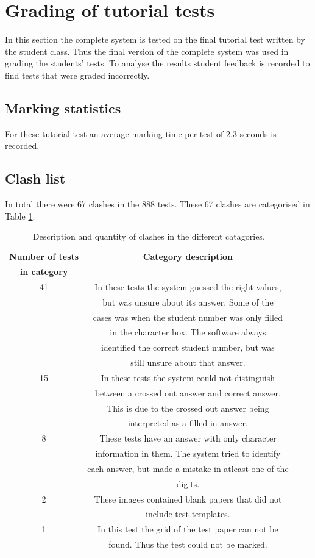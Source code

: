 \section{Grading of tutorial tests}
In this section the complete system is tested on the final tutorial test written by the student class. Thus the final version of the complete system was used in grading the students' tests. To analyse the results student feedback is recorded to find tests that were graded incorrectly. 

\subsection{Marking statistics}

For these tutorial test  an average marking time per test of 2.3 seconds is recorded.

\subsection{Clash list}

In total there were 67 clashes in the 888 tests. These 67 clashes are categorised in Table  \ref{tbl:TutClash}.
\begin{table}
  \centering
  \caption{Description and quantity of clashes in the different catagories.} \label{tbl:TutClash}
\begin{tabular}{|c|c|}
\hline
\textbf{Number of tests} & \textbf{Category description}\\
\textbf{in category} &\\
\hline
41&In these tests the system guessed the right values,\\ 
&but was unsure about its answer. Some of the\\
&cases was when the student number was only filled\\
&in the character box. The software always\\
&identified the correct student number, but was\\
&still unsure about that answer.\\
\hline
15&In these tests the system could not distinguish\\ 
&between a crossed out answer and correct answer.\\
&This is due to the crossed out answer being\\
&interpreted as a filled in answer.\\
\hline
8&These tests have an answer with only character\\ 
&information in them. The system tried to identify\\
&each answer, but made a mistake in atleast one of the\\
&digits.\\
\hline
2&These images contained blank papers that did not\\ 
&include test templates.\\
\hline
1&In this test the grid of the test paper can not be\\ 
&found. Thus the test could not be marked.\\
\hline
\end{tabular}
\end{table}

